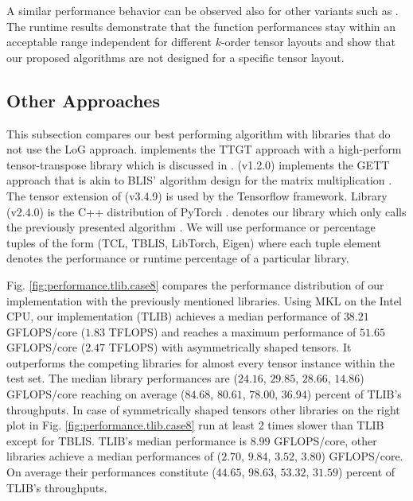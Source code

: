 A similar performance behavior can be observed also for other  variants such as .
The runtime results demonstrate that the function performances stay within an acceptable range independent for different $k$-order tensor layouts and show that our proposed algorithms are not designed for a specific tensor layout.

\subsection{Other Approaches}
This subsection compares our best performing algorithm with libraries that do not use the LoG approach.
 implements the TTGT approach with a high-perform tensor-transpose library  which is discussed in \cite{springer:2018:design}.
 (v1.2.0) implements the GETT approach that is akin to BLIS' algorithm design for the matrix multiplication \cite{matthews:2018:high}.
The tensor extension of  (v3.4.9) is used by the Tensorflow framework.
Library  (v2.4.0) is the C++ distribution of PyTorch \cite{paszke:2019:pytorch}.
 denotes our library which only calls the previously presented algorithm .
We will use performance or percentage tuples of the form (TCL, TBLIS, LibTorch, Eigen) where each tuple element denotes the performance or runtime percentage of a particular library.


Fig. \ref{fig:performance.tlib.case8} compares the performance distribution of our implementation with the previously mentioned libraries.
Using MKL on the Intel CPU, our implementation (TLIB) achieves a median performance of $38.21$ GFLOPS/core ($1.83$ TFLOPS) and reaches a maximum performance of $51.65$ GFLOPS/core ($2.47$ TFLOPS) with asymmetrically shaped tensors.
It outperforms the competing libraries for almost every tensor instance within the test set.
The median library performances are ($24.16$, $29.85$, $28.66$, $14.86$) GFLOPS/core reaching on average ($84.68$, $80.61$, $78.00$, $36.94$) percent of TLIB's throughputs.
In case of symmetrically shaped tensors other libraries on the right plot in Fig. \ref{fig:performance.tlib.case8} run at least 2 times slower than TLIB except for TBLIS.
TLIB's median performance is $8.99$ GFLOPS/core, other libraries achieve a median performances of ($2.70$, $9.84$, $3.52$, $3.80$) GFLOPS/core.
On average their performances constitute ($44.65$, $98.63$, $53.32$, $31.59$) percent of TLIB's throughputs.

